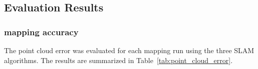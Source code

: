 \documentclass[conference]{IEEEtran}
\begin{document}

\subsection{Evaluation Results}\label{AAA}
\subsubsection{mapping accuracy}
The point cloud error was evaluated for each mapping run using the three SLAM algorithms. The results are summarized in Table~\ref{tab:point_cloud_error}.
\end{document}
